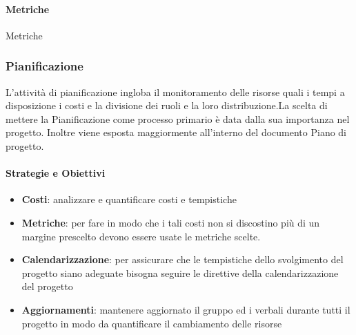             
            \paragraph{Metriche}
            Metriche
            \def\productquality{
            {   Percentuale dei requisiti soddisfatti,
                $ \frac{ReqSoddisfatti}{ReqTotali}$, 
                $ 100 \% $,
                $ 100 \% $
            },
        }
 

            
            
          
            
        \subsubsection{Pianificazione}
        L'attività di pianificazione ingloba il monitoramento delle risorse quali i tempi a disposizione i costi e la divisione dei ruoli e la loro distribuzione.La scelta di mettere la Pianificazione come processo primario è data dalla sua importanza nel progetto. Inoltre viene esposta maggiormente all'interno del documento Piano di progetto.
            \paragraph{Strategie e Obiettivi}
                \begin{itemize}
                    \item \textbf{Costi}: analizzare e quantificare costi e tempistiche
                    \item \textbf{Metriche}: per fare in modo che i  tali costi non si discostino più di un margine prescelto devono essere usate le metriche scelte.
                    \item \textbf{Calendarizzazione}: per assicurare che le tempistiche dello svolgimento del progetto siano adeguate bisogna seguire le direttive della calendarizzazione del progetto
                    \item \textbf{Aggiornamenti}: mantenere aggiornato il gruppo ed i verbali durante tutti il progetto in modo da quantificare il cambiamento delle risorse
                \end{itemize}
                
